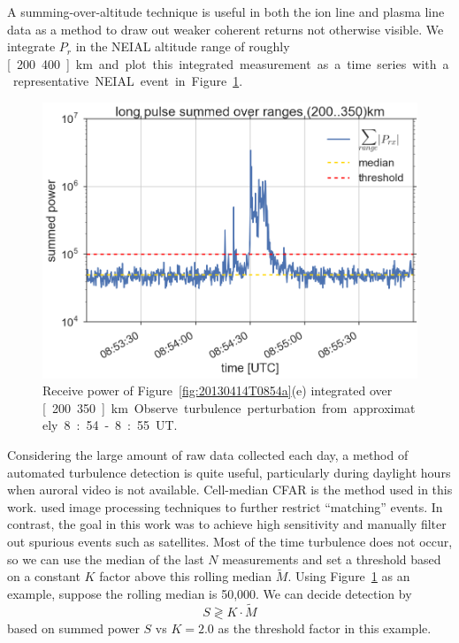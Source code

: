 A summing-over-altitude technique is useful in both the ion line and plasma line data as a method to draw out weaker coherent returns not otherwise visible.
We integrate $P_r$ in the NEIAL altitude range of roughly \unit[200..400]{km} and plot this integrated measurement as a time series with a representative NEIAL event in Figure~\ref{fig:shedintion}.
\begin{figure}
    \includegraphics[width=0.9\columnwidth]{gfx/2013-04-14T0854/summedAlt2013-04-14T08-54}
    \caption{Receive power of Figure~\ref{fig:20130414T0854a}(e) integrated over \unit[200..350]{km}. 
        Observe turbulence perturbation from approximately 8:54-8:55~UT.}
    \label{fig:shedintion}
\end{figure}
Considering the large amount of raw data collected each day, a method of automated turbulence detection is quite useful, particularly during daylight hours when auroral video is not available.
Cell-median CFAR is the method used in this work.
\citet{schlatter2014} used image processing techniques to further restrict ``matching'' events. 
In contrast, the goal in this work was to achieve high sensitivity and manually filter out spurious events such as satellites.
Most of the time turbulence does not occur, so we can use the median of the last $N$ measurements and set a threshold based on a constant $K$ factor above this rolling median $\widetilde{M}$.
Using Figure~\ref{fig:shedintion} as an example, suppose the rolling median is 50,000.
We can decide detection by
\begin{equation}\label{eq:cfarsum}
S \gtrless K\cdot\widetilde{M}
\end{equation}
based on summed power $S$ vs $K=2.0$ as the threshold factor in this example.
